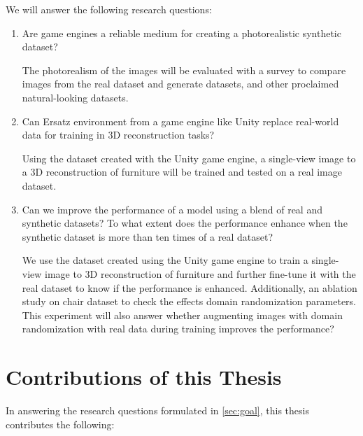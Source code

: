 We will answer the following research questions:
\begin{enumerate}
    \item Are game engines a reliable medium for creating a photorealistic synthetic dataset?

    The photorealism of the images will be evaluated with a survey to compare images from the real dataset and generate datasets, and other proclaimed natural-looking datasets.

    \item Can Ersatz environment from a game engine like Unity replace real-world data for training in 3D reconstruction tasks?

    Using the dataset created with the Unity game engine, a single-view image to a 3D reconstruction of furniture will be trained and tested on a real image dataset.

    \item Can we improve the performance of a model using a blend of real and synthetic datasets?
    To what extent does the performance enhance when the synthetic dataset is more than ten times of a real dataset?

    We use the dataset created using the Unity game engine to train a single-view image to 3D reconstruction of furniture and further fine-tune it with the real dataset to know if the performance is enhanced.
    Additionally, an ablation study on chair dataset to check the effects domain randomization parameters.
    This experiment will also answer whether augmenting images with domain randomization with real data during training improves the performance?

\end{enumerate}

\section{Contributions of this Thesis}\label{sec:contributions}
In answering the research questions formulated in \autoref{sec:goal}, this thesis contributes the following:

